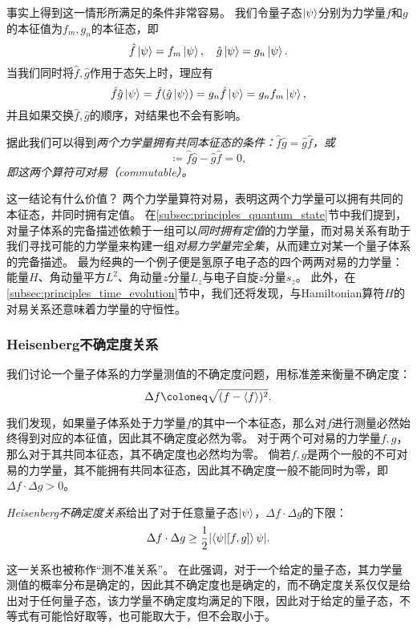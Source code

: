 事实上得到这一情形所满足的条件非常容易。
我们令量子态$\ket{\psi}$分别为力学量$f$和$g$的本征值为$f_m, g_n$的本征态，即
\begin{equation}
    \hat{f}\ket{\psi} = f_m\ket{\psi},\quad \hat{g}\ket{\psi} = g_n\ket{\psi}.
\end{equation}
当我们同时将$\hat{f},\hat{g}$作用于态矢上时，理应有
\begin{equation}
    \hat{f}\hat{g}\ket{\psi} = \hat{f}(\hat{g}\ket{\psi}) = g_n \hat{f}\ket{\psi} = g_n f_m \ket{\psi},
\end{equation}
并且如果交换$\hat{f},\hat{g}$的顺序，对结果也不会有影响。
\begin{tcolorbox}
据此我们可以得到\emph{两个力学量拥有共同本征态的条件：}$\hat{f}\hat{g}=\hat{g}\hat{f}$\emph{，或}
\begin{equation}
    [f,g] \coloneq \hat{f}\hat{g}-\hat{g}\hat{f} = 0,
\end{equation}
\emph{即这两个算符可对易（commutable）。}
\end{tcolorbox}

这一结论有什么价值？
两个力学量算符对易，表明这两个力学量可以拥有共同的本征态，并同时拥有定值。
在\ref{subsec:principles_quantum_state}节中我们提到，对量子体系的完备描述依赖于一组可以\emph{同时拥有定值}的力学量，而对易关系有助于我们寻找可能的力学量来构建一组\emph{对易力学量完全集}，从而建立对某一个量子体系的完备描述。
最为经典的一个例子便是氢原子电子态的四个两两对易的力学量：能量$H$、角动量平方$L^2$、角动量$z$分量$L_z$与电子自旋$z$分量$s_z$。
此外，在\ref{subsec:principles_time_evolution}节中，我们还将发现，与Hamiltonian算符$H$的对易关系还意味着力学量的守恒性。

\subsubsection{Heisenberg不确定度关系}

我们讨论一个量子体系的力学量测值的不确定度问题，用标准差来衡量不确定度：
\begin{equation}
    \Delta f \coloneq \sqrt{(f-\expval{f})^2}.
\end{equation}

我们发现，如果量子体系处于力学量$f$的其中一个本征态，那么对$f$进行测量必然始终得到对应的本征值，因此其不确定度必然为零。
对于两个可对易的力学量$f,g$，那么对于其共同本征态，其不确定度也必然均为零。
倘若$f,g$是两个一般的不可对易的力学量，其不能拥有共同本征态，因此其不确定度一般不能同时为零，即$\Delta f \cdot \Delta g > 0$。
\begin{tcolorbox}
\emph{Heisenberg不确定度关系}给出了对于任意量子态$\ket{\psi}$，$\Delta f \cdot \Delta g$的下限：
\begin{equation}
    \label{eq:principle_uncertainty_relation}
    \Delta f \cdot \Delta g \geq \frac12 \abs{\braket{\psi}{[f,g]}{\psi}}.
\end{equation}
\end{tcolorbox}
这一关系也被称作“测不准关系”。
在此强调，对于一个给定的量子态，其力学量测值的概率分布是确定的，因此其不确定度也是确定的，而不确定度关系仅仅是给出对于任何量子态，该力学量不确定度均满足的下限，因此对于给定的量子态，不等式有可能恰好取等，也可能取大于，但不会取小于。


